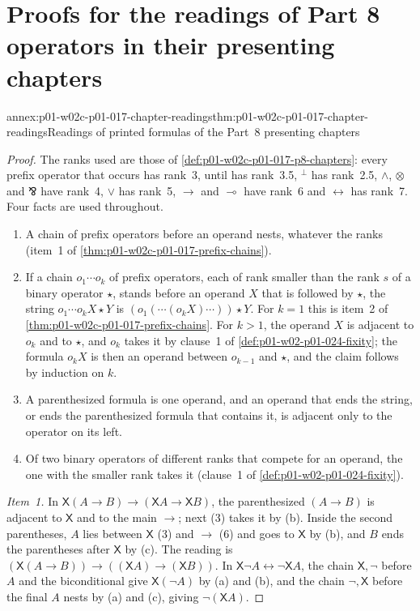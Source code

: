 \section{Proofs for the readings of Part 8 operators in their presenting chapters}
\label{sec:annex-p01-w02c-p01-017-p8-chapters}

\begin{annexitem}{annex:p01-w02c-p01-017-chapter-readings}{thm:p01-w02c-p01-017-chapter-readings}{Readings of printed formulas of the Part~8 presenting chapters}
\begin{proof}
The ranks used are those of \cref{def:p01-w02c-p01-017-p8-chapters}:
every prefix operator that occurs has rank~3, until has rank~3.5,
\({}^\perp\) has rank~2.5, \(\land\), \(\otimes\) and \(\bindnasrepma\)
have rank~4, \(\lor\) has rank~5, \(\to\) and \(\multimap\) have rank~6
and \(\leftrightarrow\) has rank~7.  Four facts are used throughout.
\begin{enumerate}
\item[(a)] A chain of prefix operators before an operand nests, whatever
  the ranks (item~1 of \cref{thm:p01-w02c-p01-017-prefix-chains}).
\item[(b)] If a chain \(o_1\cdots o_k\) of prefix operators, each of
  rank smaller than the rank \(s\) of a binary operator \(\star\), stands
  before an operand \(X\) that is followed by \(\star\), the string
  \(o_1\cdots o_kX\star Y\) is \((o_1(\cdots(o_kX)\cdots))\star Y\).  For
  \(k=1\) this is item~2 of \cref{thm:p01-w02c-p01-017-prefix-chains}.
  For \(k>1\), the operand \(X\) is adjacent to \(o_k\) and to \(\star\),
  and \(o_k\) takes it by clause~1 of \cref{def:p01-w02-p01-024-fixity};
  the formula \(o_kX\) is then an operand between \(o_{k-1}\) and
  \(\star\), and the claim follows by induction on \(k\).
\item[(c)] A parenthesized formula is one operand, and an operand that
  ends the string, or ends the parenthesized formula that contains it,
  is adjacent only to the operator on its left.
\item[(d)] Of two binary operators of different ranks that compete for
  an operand, the one with the smaller rank takes it (clause~1 of
  \cref{def:p01-w02-p01-024-fixity}).
\end{enumerate}

\emph{Item~1.}  In \(\mathsf X(A\to B)\to(\mathsf XA\to\mathsf XB)\), the
parenthesized \((A\to B)\) is adjacent to \(\mathsf X\) and to the main
\(\to\); next (3) takes it by (b).  Inside the second parentheses, \(A\)
lies between \(\mathsf X\) (3) and \(\to\) (6) and goes to \(\mathsf X\)
by (b), and \(B\) ends the parentheses after \(\mathsf X\) by (c).  The
reading is \((\mathsf X(A\to B))\to((\mathsf XA)\to(\mathsf XB))\).  In
\(\mathsf X\neg A\leftrightarrow\neg\mathsf XA\), the chain
\(\mathsf X,\neg\) before \(A\) and the biconditional give
\(\mathsf X(\neg A)\) by (a) and (b), and the chain \(\neg,\mathsf X\)
before the final \(A\) nests by (a) and (c), giving
\(\neg(\mathsf XA)\).


\end{proof}
\end{annexitem}
